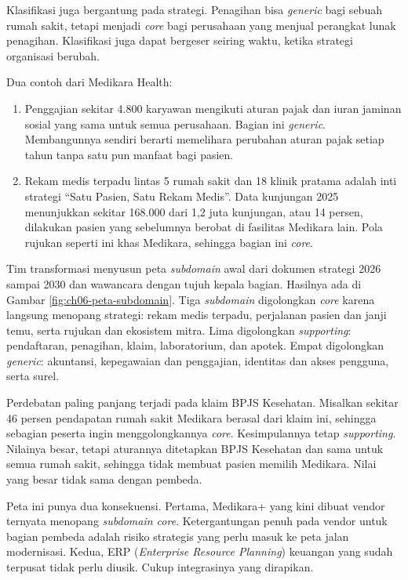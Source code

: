 Klasifikasi juga bergantung pada strategi. Penagihan bisa \textit{generic} bagi sebuah rumah
sakit, tetapi menjadi \textit{core} bagi perusahaan yang menjual perangkat lunak penagihan.
Klasifikasi juga dapat bergeser seiring waktu, ketika strategi organisasi berubah.

Dua contoh dari Medikara Health:
\begin{enumerate}
  \item Penggajian sekitar 4.800 karyawan mengikuti aturan pajak dan iuran jaminan sosial yang sama
        untuk semua perusahaan. Bagian ini \textit{generic}. Membangunnya sendiri berarti
        memelihara perubahan aturan pajak setiap tahun tanpa satu pun manfaat bagi pasien.
  \item Rekam medis terpadu lintas 5 rumah sakit dan 18 klinik pratama adalah inti strategi ``Satu
        Pasien, Satu Rekam Medis''. Data kunjungan 2025 menunjukkan sekitar 168.000 dari 1,2 juta
        kunjungan, atau 14 persen, dilakukan pasien yang sebelumnya berobat di fasilitas Medikara
        lain. Pola rujukan seperti ini khas Medikara, sehingga bagian ini \textit{core}.
\end{enumerate}

\begin{kasus}[title={Kasus Medikara Health: Peta Subdomain Awal}]
  Tim transformasi menyusun peta \textit{subdomain} awal dari dokumen strategi 2026 sampai 2030
  dan wawancara dengan tujuh kepala bagian. Hasilnya ada di Gambar \ref{fig:ch06-peta-subdomain}.
  Tiga \textit{subdomain} digolongkan \textit{core} karena langsung menopang strategi: rekam medis
  terpadu, perjalanan pasien dan janji temu, serta rujukan dan ekosistem mitra. Lima digolongkan
  \textit{supporting}: pendaftaran, penagihan, klaim, laboratorium, dan apotek. Empat digolongkan
  \textit{generic}: akuntansi, kepegawaian dan penggajian, identitas dan akses
  pengguna, serta surel.

  Perdebatan paling panjang terjadi pada klaim BPJS Kesehatan. Misalkan sekitar 46 persen
  pendapatan rumah sakit Medikara berasal dari klaim ini, sehingga sebagian peserta ingin
  menggolongkannya \textit{core}. Kesimpulannya tetap \textit{supporting}. Nilainya besar, tetapi
  aturannya ditetapkan BPJS Kesehatan dan sama untuk semua rumah sakit, sehingga tidak membuat
  pasien memilih Medikara. Nilai yang besar tidak sama dengan pembeda.

  Peta ini punya dua konsekuensi. Pertama, Medikara+ yang kini dibuat vendor ternyata menopang
  \textit{subdomain core}. Ketergantungan penuh pada vendor untuk bagian pembeda adalah risiko
  strategis yang perlu masuk ke peta jalan modernisasi. Kedua, ERP (\textit{Enterprise Resource
  Planning}) keuangan yang sudah terpusat tidak perlu diusik. Cukup integrasinya yang dirapikan.
\end{kasus}

